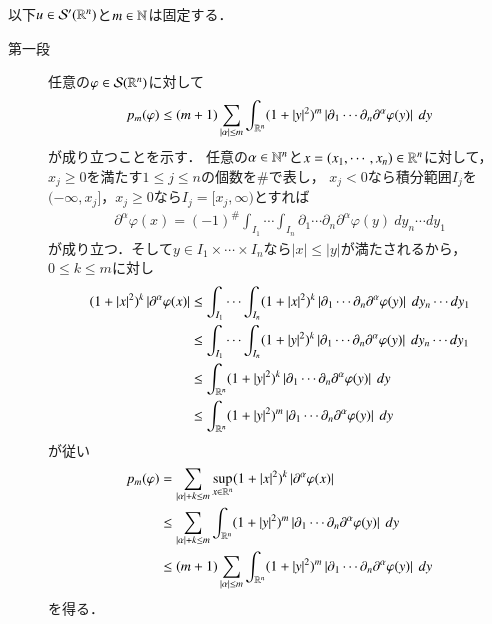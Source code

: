 	\begin{prf}以下$u \in \mathcal{S}'(\mathbb{R}^n)$と$m \in \mathbb{N}$は固定する．
		\begin{description}
			\item[第一段]
				任意の$\varphi \in \mathcal{S}(\mathbb{R}^n)$に対して
				\begin{align}
					p_m(\varphi)
					\leq (m+1) \sum_{|\alpha| \leq m} \int_{\mathbb{R}^n} (1+|y|^2)^m \left| \partial_1 \cdots \partial_n\partial^\alpha \varphi(y) \right|\ dy
					\label{eq:structure_theorem_of_tempered_distributions_1}
				\end{align}
				が成り立つことを示す．
				任意の$\alpha \in \mathbb{N}^n$と$x = (x_1,\cdots,x_n) \in \mathbb{R}^n$に対して，
				$x_j \geq 0$を満たす$1 \leq j \leq n$の個数を$\#$で表し，
				$x_j < 0$なら積分範囲$I_j$を$(-\infty,x_j]$，$x_j \geq 0$なら$I_j = [x_j,\infty)$とすれば
				\begin{align}
					\partial^\alpha \varphi(x)
					= (-1)^{\#} \int_{I_1}\cdots\int_{I_n} \partial_1 \cdots \partial_n\partial^\alpha \varphi(y)\ dy_n \cdots dy_1
				\end{align}
				が成り立つ．そして$y \in I_1 \times \cdots \times I_n$なら$|x| \leq |y|$が満たされるから，
				$0 \leq k \leq m$に対し
				\begin{align}
					(1+|x|^2)^k \left| \partial^\alpha \varphi(x) \right|
					&\leq \int_{I_1}\cdots\int_{I_n} (1+|x|^2)^k \left| \partial_1 \cdots \partial_n\partial^\alpha \varphi(y) \right|\ dy_n \cdots dy_1 \\
					&\leq \int_{I_1}\cdots\int_{I_n} (1+|y|^2)^k \left| \partial_1 \cdots \partial_n\partial^\alpha \varphi(y) \right|\ dy_n \cdots dy_1 \\
					&\leq \int_{\R^n} (1+|y|^2)^k \left| \partial_1 \cdots \partial_n\partial^\alpha \varphi(y) \right|\ dy \\
					&\leq \int_{\R^n} (1+|y|^2)^m \left| \partial_1 \cdots \partial_n\partial^\alpha \varphi(y) \right|\ dy
				\end{align}
				が従い
				\begin{align}
					p_m(\varphi) &= \sum_{|\alpha|+k \leq m} \operatorname*{sup}_{x \in \mathbb{R}^n} (1+|x|^2)^k \left| \partial^\alpha \varphi(x) \right| \\
					&\leq \sum_{|\alpha|+k \leq m} \int_{\mathbb{R}^n} (1+|y|^2)^m \left| \partial_1 \cdots \partial_n\partial^\alpha \varphi(y) \right|\ dy \\
					&\leq (m+1) \sum_{|\alpha| \leq m} \int_{\mathbb{R}^n} (1+|y|^2)^m \left| \partial_1 \cdots \partial_n\partial^\alpha \varphi(y) \right|\ dy
				\end{align}
				を得る．
				

\end{description}
\end{prf}
